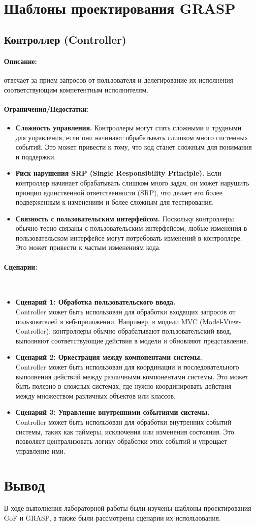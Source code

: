 \documentclass[12pt,onecolumn]{article}
\newcommand{\nparagraph}[1]{\paragraph{#1}\mbox{}\\}
\begin{document}
\section{Шаблоны проектирования GRASP}
\subsection{Контроллер (Controller)}
\paragraph{Описание:} отвечает за прием запросов от пользователя и делегирование их исполнения соответствующим компетентным исполнителям.
\paragraph{Ограничения/Недостатки:}
\begin{itemize}
  \item \textbf{Сложность управления.} Контроллеры могут стать сложными и трудными для управления, если они начинают обрабатывать слишком много системных событий. Это может привести к тому, что код станет сложным для понимания и поддержки.
  \item \textbf{Риск нарушения SRP (Single Responsibility Principle).} Если контроллер начинает обрабатывать слишком много задач, он может нарушить принцип единственной ответственности (SRP), что делает его более подверженным к изменениям и более сложным для тестирования.
  \item \textbf{Связность с пользовательским интерфейсом.} Поскольку контроллеры обычно тесно связаны с пользовательским интерфейсом, любые изменения в пользовательском интерфейсе могут потребовать изменений в контроллере. Это может привести к частым изменениям кода.
\end{itemize}
\nparagraph{Сценарии:}
\begin{itemize}
  \item{
    \textbf{Сценарий 1: Обработка пользовательского ввода.} \\
    Controller может быть использован для обработки входящих запросов от пользователей в веб-приложении. Например, в модели MVC (Model-View-Controller), контроллеры обычно обрабатывают пользовательский ввод, выполняют соответствующие действия в модели и обновляют представление.
  }
  \item{
    \textbf{Сценарий 2: Оркестрация между компонентами системы.} \\
    Controller может быть использован для координации и последовательного выполнения действий между различными компонентами системы. Это может быть полезно в сложных системах, где нужно координировать действия между множеством различных объектов или классов.
  }
  \item {
    \textbf{Сценарий 3: Управление внутренними событиями системы.} \\
    Controller может быть использован для обработки внутренних событий системы, таких как таймеры, исключения или изменения состояния. Это позволяет централизовать логику обработки этих событий и упрощает управление ими.
  }
\end{itemize}
\section{Вывод}
В ходе выполнения лабораторной работы были изучены шаблоны проектирования GoF и GRASP, а также были рассмотрены сценарии их использования.
\end{document}
